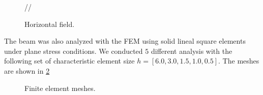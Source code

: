 \documentclass[12pt,letterpaper]{article}
\begin{document}
\begin{figure}[H]
\centering
{}//
\caption{Horizontal field.}
\label{fig:ecuacion}
\end{figure}

The beam was also analyzed with the FEM using solid lineal square elements under plane stress conditions. We conducted $5$ different analysis with the following set of characteristic element size $h=[6.0,3.0,1.5,1.0,0.5]$. The meshes are shown in \cref{fig:mallas}

\begin{figure}[H]
\centering
{}
\caption{Finite element meshes.}
\label{fig:mallas}
\end{figure}
\end{document}
